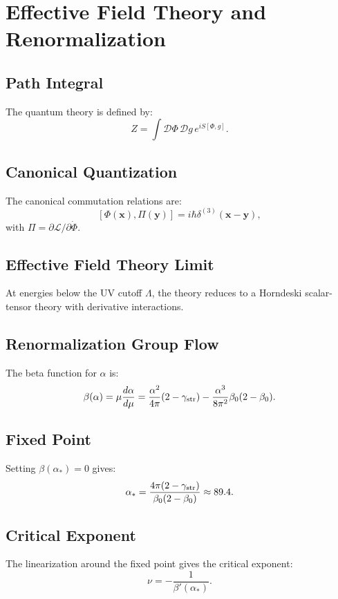 \documentclass[12pt,oneside]{book}
\begin{document}
\chapter{Effective Field Theory and Renormalization}

\section{Path Integral}

The quantum theory is defined by:
\[
Z = \int \mathcal{D}\Phi \, \mathcal{D}g \, e^{iS[\Phi,g]}.
\]

\section{Canonical Quantization}

The canonical commutation relations are:
\[
[\Phi(\mathbf{x}), \Pi(\mathbf{y})] = i\hbar \delta^{(3)}(\mathbf{x}-\mathbf{y}),
\]
with $\Pi = \partial \mathcal{L}/\partial \dot{\Phi}$.

\section{Effective Field Theory Limit}

At energies below the UV cutoff $\Lambda$, the theory reduces to a Horndeski scalar-tensor theory with derivative interactions.

\section{Renormalization Group Flow}

The beta function for $\alpha$ is:
\[
\beta(\alpha) = \mu \frac{d\alpha}{d\mu}
= \frac{\alpha^2}{4\pi}(2-\gamma_{\rm str})
- \frac{\alpha^3}{8\pi^2}\beta_0(2-\beta_0).
\]

\section{Fixed Point}

Setting $\beta(\alpha_*)=0$ gives:
\[
\alpha_* = \frac{4\pi(2-\gamma_{\rm str})}{\beta_0(2-\beta_0)} \approx 89.4.
\]

\section{Critical Exponent}

The linearization around the fixed point gives the critical exponent:
\[
\nu = -\frac{1}{\beta'(\alpha_*)}.
\]
\end{document}
